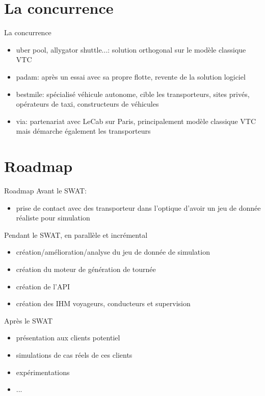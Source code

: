\documentclass[table]{beamer}
\begin{document}
\section{La concurrence}

\begin{frame}{La concurrence}

  \begin{itemize}
  \item uber pool, allygator shuttle...: solution orthogonal sur le
    modèle classique VTC
  \item padam: après un essai avec sa propre flotte, revente de la
    solution logiciel
  \item bestmile: spécialisé véhicule autonome, cible les
    transporteurs, sites privés, opérateurs de taxi, constructeurs de
    véhicules
  \item via: partenariat avec LeCab sur Paris, principalement modèle
    classique VTC mais démarche également les transporteurs
  \end{itemize}
\end{frame}

\section{Roadmap}

\begin{frame}{Roadmap}
  Avant le SWAT:
  \begin{itemize}
  \item prise de contact avec des transporteur dans l'optique d'avoir
    un jeu de donnée réaliste pour simulation
  \end{itemize}

  Pendant le SWAT, en parallèle et incrémental
  \begin{itemize}
  \item création/amélioration/analyse du jeu de donnée de simulation
  \item création du moteur de génération de tournée
  \item création de l'API
  \item création des IHM voyageurs, conducteurs et supervision
  \end{itemize}
  
  Après le SWAT
  \begin{itemize}
  \item présentation aux clients potentiel
  \item simulations de cas réels de ces clients
  \item expérimentations
  \item ...
  \end{itemize}
\end{frame}
\end{document}
